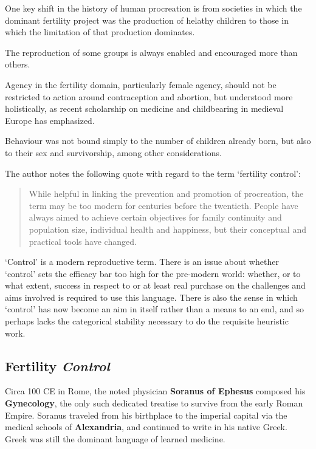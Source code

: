 \begin{nte}
    One key shift in the history of human procreation is from societies in which the dominant fertility project was the production of helathy children to those in which the limitation of that production dominates.
\end{nte}

The reproduction of some groups is always enabled and encouraged more than others.

Agency in the fertility domain, particularly female agency, should not be restricted to action around contraception and abortion, but understood more holistically, as recent scholarship on medicine and childbearing in medieval Europe has emphasized.

\begin{rmk}
    Behaviour was not bound simply to the number of children already born, but also to their sex and survivorship, among other considerations.
\end{rmk}


The author notes the following quote with regard to the term `fertility control':

\begin{quotation}
    While helpful in linking the prevention and promotion of procreation, the term may be too modern for centuries before the twentieth. People have always aimed to achieve certain objectives for family continuity and population size, individual health and happiness, but their conceptual and practical tools have changed.
\end{quotation}


`Control' is a modern reproductive term. There is an issue about whether `control' sets the efficacy bar too high for the pre-modern world: whether, or to what extent, success in respect to or at least real purchase on the challenges and aims involved is required to use this language. There is also the sense in which `control' has now become an aim in itself rather than a means to an end, and so perhaps lacks the categorical stability necessary to do the requisite heuristic work.


\subsection{Fertility \textit{Control}}

Circa 100 CE in Rome, the noted physician \textbf{Soranus of Ephesus} composed his \textbf{Gynecology}, the only such dedicated treatise to survive from the early Roman Empire. Soranus traveled from his birthplace to the imperial capital via the medical schools of \textbf{Alexandria}, and continued to write in his native Greek. Greek was still the dominant language of learned medicine.

